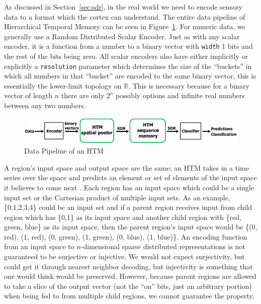 \documentclass[oneside,12pt,openany]{book}
\begin{document}
	As discussed in Section~\ref{sec:sdr}, in the real world we need to encode sensory data to a format which the cortex can understand. The entire data pipeline of Hierarchical Temporal Memory can be seen in Figure~\ref{fig:HTMpipeline}. For numeric data, we generally use a Random Distributed Scalar Encoder. Just as with any scalar encoder, it is a function from a number to a binary vector with \texttt{width} 1 bits and the rest of the bits being zero. All scalar encoders also have either implicitly or explicitly a \texttt{resolution} parameter which determines the size of the ``buckets'' in which all numbers in that ``bucket'' are encoded to the same binary vector, this is essentially the lower-limit topology on $\mathbb{R}$. This is necessary because for a binary vector of length $n$ there are only $2^{n}$ possibly options and infinite real numbers between any two numbers.
	
	\begin{figure}[hbt!]
		\centering
		\includegraphics[width=\linewidth]{images/DataPipeline.jpg}
		\caption[Data Pipeline of an HTM]{Data Pipeline of an HTM~\cite{TheHTMSpatialPooler}}
		\label{fig:HTMpipeline}
	\end{figure}

	A region's input space and output space are the same; an HTM takes in a time series over the space and predicts an element or set of elements of the input space it believes to come next \cite{Purdy}. Each region has an input space which could be a single input set or the Cartesian product of multiple input sets. As an example, \{0,1,2,3,4\} could be an input set and if a parent region receives input from child region which has \{0,1\} as its input space and another child region with \{red, green, blue\} as its input space, then the parent region's input space would be \{(0, red), (1, red), (0, green), (1, green), (0, blue), (1, blue)\}. An encoding function from an input space to $n$-dimensional sparse distributed representations is not guaranteed to be surjective or injective. We would not expect surjectivity, but could get it through nearest neighbor decoding, but injectivity is something that one would think would be preserved. However, because parent regions are allowed to take a slice of the output vector (not the ``on'' bits, just an arbitrary portion) when being fed to from multiple child regions, we cannot guarantee the property.
	
\end{document}
